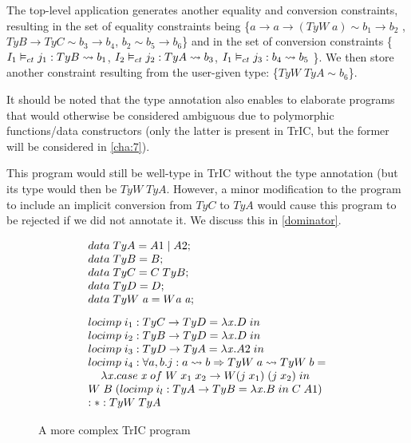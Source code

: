 The top-level application generates another equality and conversion constraints, resulting in the set of equality constraints being \{$a \to a \to (TyW \; a) \sim b_1 \to b_2$ ,$TyB \to TyC \sim b_3 \to b_4$, $b_2 \sim b_5 \to b_6$\} and in the set of conversion constraints \{${I_1} \vDash_{ct} {j_1}: {TyB} \rightsquigarrow {b_1}$, ${I_2} \vDash_{ct} {j_2}: {TyA} \rightsquigarrow {b_3}$, ${I_1} \vDash_{ct} {j_3}: {b_4} \rightsquigarrow {b_5}$ \}. We then store another constraint resulting from the user-given type: \{$TyW \; TyA \sim b_6$\}.

It should be noted that the type annotation also enables to elaborate programs that would otherwise be considered ambiguous due to polymorphic functions/data constructors (only the latter is present in TrIC, but the former will be considered in \ref{cha:7}).

This program would still be well-type in TrIC without the type annotation (but its type would then be $TyW \; TyA$. However, a minor modification to the program to include an implicit conversion from $TyC$ to $TyA$ would cause this program to be rejected if we did not annotate it. We discuss this in \ref{dominator}.


\begin{figure}
     \[
\begin{array}{@{\hspace{0mm}}l@{\hspace{0mm}}}
  data\;TyA=A1\;|\;A2;\\
  data\;TyB=B;\\
  data\;TyC=C \; TyB;\\
  data\;TyD=D;\\
  data\;TyW\;\tyVar=W \tyVar \; \tyVar;\\[3mm]
  \monolocal{i_1}{TyC}{TyD}{\lambda \tmVar . D}\\
  \monolocal{i_2}{TyB}{TyD}{\lambda \tmVar . D}\\
  \monolocal{i_3}{TyD}{TyA}{\lambda \tmVar . A2}\\
  locimp\;i_4 :\forall a, b . j : a \rightsquigarrow b \Rightarrow TyW\;a\rightsquigarrow TyW\;b=\\
  \phantom{xx}\lambda \tmVar. case\;\tmVar\; of\;W\;x_1\;x_2 \to W (j\;x_1)\;(j\;x_2)\;in \\
  W\;B\;(\monolocal{i_l}{TyA}{TyB}{\lambda \tmVar.B} C\;A1)
  \\
  :*: TyW \; TyA
\end{array}
\]
\caption{A more complex TrIC program}
\label{complex5}
\end{figure}

